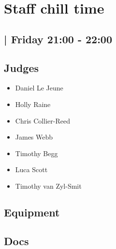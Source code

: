 \documentclass[10pt]{article}
\begin{document}
		\begin{minipage}{\linewidth}
		\setcounter{section}{8}
	\section{Staff chill time }
	\subsection*{ | Friday 21:00 - 22:00}

	

	\begin{multicols}{2}
	\subsection*{\faUsers \: Judges}
	\begin{itemize}
			\item Daniel Le Jeune
			\item Holly Raine
			\item Chris Collier-Reed
			\item James Webb
			\item Timothy Begg
			\item Luca Scott
			\item Timothy van Zyl-Smit
		\end{itemize}
	\columnbreak
	\subsection*{\faWrench \: Equipment}
	        \vfill\null
        \subsection*{\faFile \: Docs}
     	\end{multicols}


	\vspace{1cm}
	\end{minipage}
\end{document}
